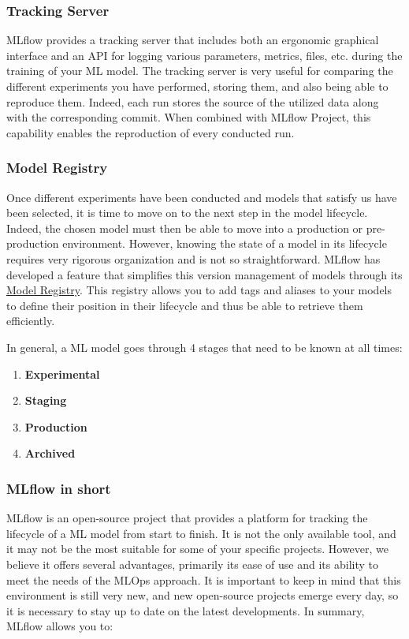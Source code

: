 \subsubsection{Tracking Server}

MLflow provides a tracking server that includes both an ergonomic graphical interface and an API for logging various parameters, metrics, files, etc. during the training of your ML model. The tracking server is very useful for comparing the different experiments you have performed, storing them, and also being able to reproduce them. Indeed, each run stores the source of the utilized data along with the corresponding commit. When combined with MLflow Project, this capability enables the reproduction of every conducted run.

\subsubsection{Model Registry}

Once different experiments have been conducted and models that satisfy us have been selected, it is time to move on to the next step in the model lifecycle. Indeed, the chosen model must then be able to move into a production or pre-production environment. However, knowing the state of a model in its lifecycle requires very rigorous organization and is not so straightforward. MLflow has developed a feature that simplifies this version management of models through its \href{https://MLflow.org/docs/latest/model-registry.html}{Model Registry}. This registry allows you to add tags and aliases to your models to define their position in their lifecycle and thus be able to retrieve them efficiently.

In general, a ML model goes through 4 stages that need to be known at all times:

\begin{enumerate}
    \item \textbf{Experimental}
    \item \textbf{Staging}
    \item \textbf{Production}
    \item \textbf{Archived}
\end{enumerate}


\subsubsection{MLflow in short}

MLflow is an open-source project that provides a platform for tracking the lifecycle of a ML model from start to finish. It is not the only available tool, and it may not be the most suitable for some of your specific projects. However, we believe it offers several advantages, primarily its ease of use and its ability to meet the needs of the MLOps approach. It is important to keep in mind that this environment is still very new, and new open-source projects emerge every day, so it is necessary to stay up to date on the latest developments. In summary, MLflow allows you to:

